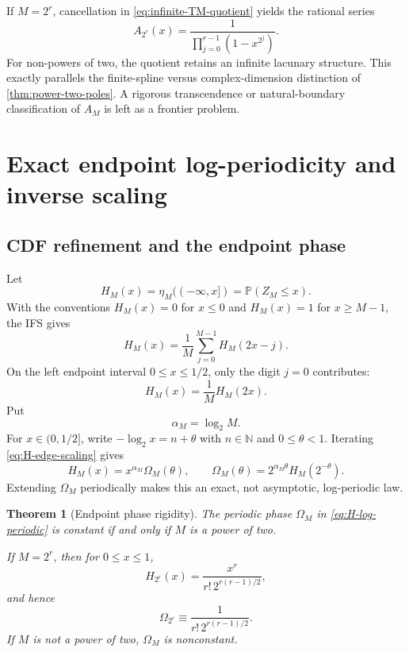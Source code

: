 \documentclass[11pt,oneside]{article}
\newtheorem{theorem}{Theorem}[section]
\theoremstyle{definition}
\theoremstyle{remark}
\newcommand{\N}{\mathbb N}
\numberwithin{equation}{section}
\newcommand{\1}{\mathbf 1}
\begin{document}
If $M=2^r$, cancellation in \eqref{eq:infinite-TM-quotient} yields the rational series
\begin{equation}
 A_{2^r}(x)=\frac1{\prod_{j=0}^{r-1}(1-x^{2^j})}.
 \label{eq:A-power-two}
\end{equation}
For non-powers of two, the quotient retains an infinite lacunary structure.  This exactly
parallels the finite-spline versus complex-dimension distinction of
\cref{thm:power-two-poles}.  A rigorous transcendence or natural-boundary classification of
$A_M$ is left as a frontier problem.

\section{Exact endpoint log-periodicity and inverse scaling}
\label{sec:endpoint}

\subsection{CDF refinement and the endpoint phase}

Let
\begin{equation}
 H_M(x)=\eta_M(( -\infty,x])=\mathbb P(Z_M\le x).
 \label{eq:HM}
\end{equation}
With the conventions $H_M(x)=0$ for $x\le0$ and $H_M(x)=1$ for $x\ge M-1$, the IFS
gives
\begin{equation}
 H_M(x)=\frac1M\sum_{j=0}^{M-1}H_M(2x-j).
 \label{eq:H-refinement}
\end{equation}
On the left endpoint interval $0\le x\le1/2$, only the digit $j=0$ contributes:
\begin{equation}
 H_M(x)=\frac1M H_M(2x).
 \label{eq:H-edge-scaling}
\end{equation}
Put
\begin{equation}
 \alpha_M=\log_2M.
 \label{eq:alphaM}
\end{equation}
For $x\in(0,1/2]$, write
$-\log_2x=n+\theta$ with $n\in\N$ and $0\le\theta<1$.  Iterating
\eqref{eq:H-edge-scaling} gives
\begin{equation}
 H_M(x)=x^{\alpha_M}\Omega_M(\theta),
 \qquad
 \Omega_M(\theta)=2^{\alpha_M\theta}H_M(2^{-\theta}).
 \label{eq:H-log-periodic}
\end{equation}
Extending $\Omega_M$ periodically makes this an exact, not asymptotic, log-periodic law.

\begin{theorem}[Endpoint phase rigidity]
\label{thm:endpoint-rigidity}
The periodic phase $\Omega_M$ in \eqref{eq:H-log-periodic} is constant if and only if
$M$ is a power of two.

If $M=2^r$, then for $0\le x\le1$,
\begin{equation}
 H_{2^r}(x)=\frac{x^r}{r!\,2^{r(r-1)/2}},
 \label{eq:H-power-two-edge}
\end{equation}
and hence
\begin{equation}
 \Omega_{2^r}\equiv\frac1{r!\,2^{r(r-1)/2}}.
 \label{eq:Omega-power-two}
\end{equation}
If $M$ is not a power of two, $\Omega_M$ is nonconstant.
\end{theorem}
\end{document}
